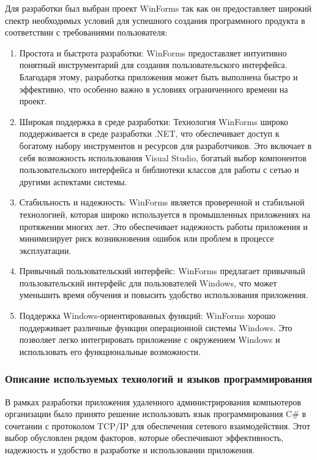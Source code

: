 Для разработки был выбран проект WinForms так как он предоставляет широкий спектр необходимых условий для успешного создания программного продукта в соответствии с требованиями пользователя:
\begin{enumerate}
	\item Простота и быстрота разработки: WinForms предоставляет интуитивно понятный инструментарий для создания пользовательского интерфейса. Благодаря этому, разработка приложения может быть выполнена быстро и эффективно, что особенно важно в условиях ограниченного времени на проект.

	\item Широкая поддержка в среде разработки: Технология WinForms широко поддерживается в среде разработки .NET, что обеспечивает доступ к богатому набору инструментов и ресурсов для разработчиков. Это включает в себя возможность использования Visual Studio, богатый выбор компонентов пользовательского интерфейса и библиотеки классов для работы с сетью и другими аспектами системы.

	\item Стабильность и надежность: WinForms является проверенной и стабильной технологией, которая широко используется в промышленных приложениях на протяжении многих лет. Это обеспечивает надежность работы приложения и минимизирует риск возникновения ошибок или проблем в процессе эксплуатации.

	\item Привычный пользовательский интерфейс: WinForms предлагает привычный пользовательский интерфейс для пользователей Windows, что может уменьшить время обучения и повысить удобство использования приложения.

	\item Поддержка Windows-ориентированных функций: WinForms хорошо поддерживает различные функции операционной системы Windows. Это позволяет легко интегрировать приложение с окружением Windows и использовать его функциональные возможности.
\end{enumerate}

\subsubsection{Описание используемых технологий и языков программирования}

В рамках разработки приложения удаленного администрирования компьютеров организации было принято решение использовать язык программирования C\# в сочетании с протоколом TCP/IP для обеспечения сетевого взаимодействия. Этот выбор обусловлен рядом факторов, которые обеспечивают эффективность, надежность и удобство в разработке и использовании приложения.


